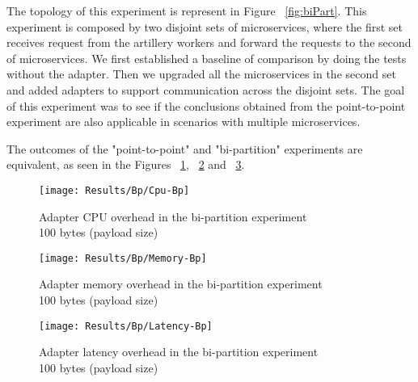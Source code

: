 The topology of this experiment is represent in Figure ~\ref{fig:biPart}.
This experiment is composed by two disjoint sets of microservices, where the first set receives request from the artillery workers and forward the requests to the second of microservices.
We first established a baseline of comparison by doing the tests without the adapter.
Then we upgraded all the microservices in the second set and added adapters to support communication across the disjoint sets.
The goal of this experiment was to see if the conclusions obtained from the point-to-point experiment are also applicable in scenarios with multiple microservices.

The outcomes of the "point-to-point" and "bi-partition" experiments are equivalent, as seen in the Figures ~\ref{fig:biPartCPU}, ~\ref{fig:biPartMem} and ~\ref{fig:biPartLatency}.

\begin{figure}[htbp]
    \centering
    \texttt{[image: Results/Bp/Cpu-Bp]}
    \caption{Adapter CPU overhead in the bi-partition experiment \\\hspace{\textwidth} 100 bytes (payload size)}
    \label{fig:biPartCPU}
\end{figure}

\begin{figure}[htbp]
    \centering
    \texttt{[image: Results/Bp/Memory-Bp]}
    \caption{Adapter memory overhead in the bi-partition experiment \\\hspace{\textwidth} 100 bytes (payload size)}
    \label{fig:biPartMem}
\end{figure}

\begin{figure}[htbp]
    \centering
    \texttt{[image: Results/Bp/Latency-Bp]}
    \caption{Adapter latency overhead in the bi-partition experiment \\\hspace{\textwidth} 100 bytes (payload size)}
    \label{fig:biPartLatency}
\end{figure}